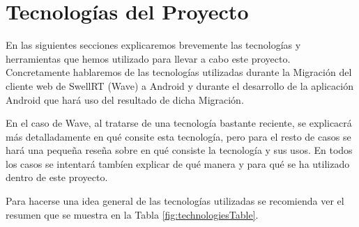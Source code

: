 \newpage
\thispagestyle{sectioned}
\chapter{Tecnologías del Proyecto}

En las siguientes secciones explicaremos brevemente las tecnologías y herramientas que hemos utilizado para llevar a cabo este proyecto. Concretamente hablaremos de las tecnologías utilizadas durante la Migración del cliente web de SwellRT (Wave) a Android y durante el desarrollo de la aplicación Android que hará uso del resultado de dicha Migración. 

En el caso de Wave, al tratarse de una tecnología bastante reciente, se explicacrá más detalladamente en qué consite esta tecnología, pero para el resto de casos se hará una pequeña reseña sobre en qué consiste la tecnología y sus usos. En todos los casos se intentará tambíen explicar de qué manera y para qué se ha utilizado dentro de este proyecto.

Para hacerse una idea general de las tecnologías utilizadas se recomienda ver el resumen que se muestra en la Tabla \ref{fig:technologiesTable}. 
 
